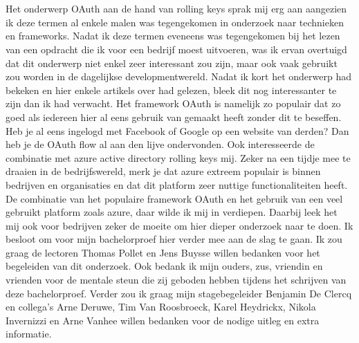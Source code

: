 
\chapter*{}
\label{ch:voorwoord}

Het onderwerp OAuth aan de hand van rolling keys sprak mij erg aan aangezien ik deze termen al enkele malen was tegengekomen in onderzoek naar technieken en frameworks. Nadat ik deze termen eveneens was tegengekomen bij het lezen van een opdracht die ik voor een bedrijf moest uitvoeren, was ik ervan overtuigd dat dit onderwerp niet enkel zeer interessant zou zijn, maar ook vaak gebruikt zou worden in de dagelijkse developmentwereld. \newline\newline
Nadat ik kort het onderwerp had bekeken en hier enkele artikels over had gelezen, bleek dit nog interessanter te zijn dan ik had verwacht. Het framework OAuth is namelijk zo populair dat zo goed als iedereen hier al eens gebruik van gemaakt heeft zonder dit te beseffen. Heb je al eens ingelogd met Facebook of Google op een website van derden? Dan heb je de OAuth flow al aan den lijve ondervonden. \newline\newline
Ook interesseerde de combinatie met azure active directory rolling keys mij. Zeker na een tijdje mee te draaien in de bedrijfswereld, merk je dat azure extreem populair is binnen bedrijven en organisaties en dat dit platform zeer nuttige functionaliteiten heeft. \newline\newline
De combinatie van het populaire framework OAuth en het gebruik van een veel gebruikt platform zoals azure, daar wilde ik mij in verdiepen. Daarbij leek het mij ook voor bedrijven zeker de moeite om hier dieper onderzoek naar te doen. Ik besloot om voor mijn bachelorproef hier verder mee aan de slag te gaan. \newline\newline
Ik zou graag de lectoren Thomas Pollet en Jens Buysse willen bedanken voor het begeleiden van dit onderzoek. Ook bedank ik mijn ouders, zus, vriendin en vrienden voor de mentale steun die zij geboden hebben tijdens het schrijven van deze bachelorproef. Verder zou ik graag mijn stagebegeleider Benjamin De Clercq en collega's Arne Deruwe, Tim Van Roosbroeck, Karel Heydrickx, Nikola Invernizzi en Arne Vanhee willen bedanken voor de nodige uitleg en extra informatie.

